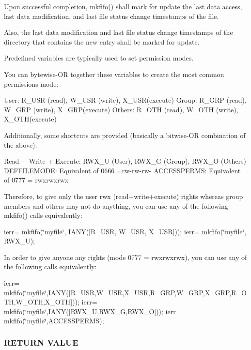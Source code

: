 Upon successful completion, mkfifo() shall mark for update the last data access, last data modification, and last file status change timestamps of the file.

Also, the last data modification and last file status change timestamps of the directory that contains the new entry shall be marked for update.

Predefined variables are typically used to set permission modes.

You can bytewise-\/\+OR together these variables to create the most common permissions mode\+:

User\+: R\+\_\+\+U\+SR (read), W\+\_\+\+U\+SR (write), X\+\_\+\+U\+S\+R(execute) Group\+: R\+\_\+\+G\+RP (read), W\+\_\+\+G\+RP (write), X\+\_\+\+G\+R\+P(execute) Others\+: R\+\_\+\+O\+TH (read), W\+\_\+\+O\+TH (write), X\+\_\+\+O\+T\+H(execute)

Additionally, some shortcuts are provided (basically a bitwise-\/\+OR combination of the above)\+:

Read + Write + Execute\+: R\+W\+X\+\_\+U (User), R\+W\+X\+\_\+G (Group), R\+W\+X\+\_\+O (Others) D\+E\+F\+F\+I\+L\+E\+M\+O\+DE\+: Equivalent of 0666 =rw-\/rw-\/rw-\/ A\+C\+C\+E\+S\+S\+P\+E\+R\+MS\+: Equivalent of 0777 = rwxrwxrwx

Therefore, to give only the user rwx (read+write+execute) rights whereas group members and others may not do anything, you can use any of the following mkfifo() calls equivalently\+:

ierr= mkfifo(\char`\"{}myfile\char`\"{}, I\+A\+N\+Y(\mbox{[}\+R\+\_\+\+U\+S\+R, W\+\_\+\+U\+S\+R, X\+\_\+\+U\+S\+R\mbox{]})); ierr= mkfifo(\char`\"{}myfile\char`\"{}, R\+W\+X\+\_\+U);

In order to give anyone any rights (mode 0777 = rwxrwxrwx), you can use any of the following calls equivalently\+:

ierr= mkfifo(\char`\"{}myfile\char`\"{},I\+A\+N\+Y(\mbox{[}\+R\+\_\+\+U\+S\+R,\+W\+\_\+\+U\+S\+R,\+X\+\_\+\+U\+S\+R,\+R\+\_\+\+G\+R\+P,\+W\+\_\+\+G\+R\+P,\+X\+\_\+\+G\+R\+P,\+R\+\_\+\+O\+T\+H,\+W\+\_\+\+O\+T\+H,\+X\+\_\+\+O\+T\+H\mbox{]})); ierr= mkfifo(\char`\"{}myfile\char`\"{},I\+A\+N\+Y(\mbox{[}\+R\+W\+X\+\_\+\+U,\+R\+W\+X\+\_\+\+G,\+R\+W\+X\+\_\+\+O\mbox{]})); ierr= mkfifo(\char`\"{}myfile\char`\"{},A\+C\+C\+E\+S\+S\+P\+E\+R\+MS); \subsubsection*{R\+E\+T\+U\+RN V\+A\+L\+UE}

